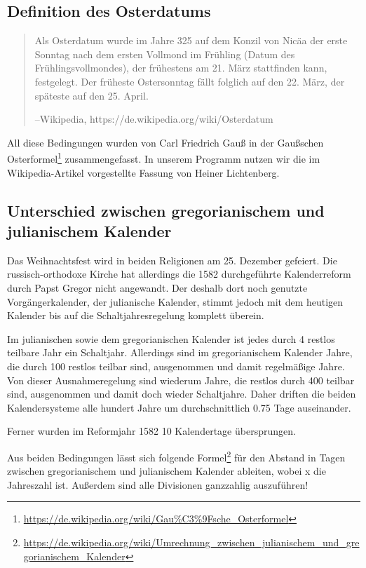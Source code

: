 \subsection{Definition des Osterdatums}
	\begin{quote}
		Als Osterdatum wurde im Jahre 325 auf dem Konzil von Nicäa der erste Sonntag nach dem ersten Vollmond im Frühling (Datum des Frühlingsvollmondes), der frühestens am 21. März stattfinden kann, festgelegt. Der früheste Ostersonntag fällt folglich auf den 22. März, der späteste auf den 25. April.

		\hfill{}--Wikipedia, https://de.wikipedia.org/wiki/Osterdatum
	\end{quote}

	All diese Bedingungen wurden von Carl Friedrich Gauß in der Gaußschen Osterformel\footnote{\url{https://de.wikipedia.org/wiki/Gau\%C3\%9Fsche_Osterformel}} zusammengefasst. In unserem Programm nutzen wir die im Wikipedia-Artikel vorgestellte Fassung von Heiner Lichtenberg.
\subsection{Unterschied zwischen gregorianischem und julianischem Kalender}
	Das Weihnachtsfest wird in beiden Religionen am 25. Dezember gefeiert. Die russisch-orthodoxe Kirche hat allerdings die 1582 durchgeführte Kalenderreform durch Papst Gregor nicht angewandt. Der deshalb dort noch genutzte Vorgängerkalender, der julianische Kalender, stimmt jedoch mit dem heutigen Kalender bis auf die Schaltjahresregelung komplett überein.

	Im julianischen sowie dem gregorianischen Kalender ist jedes durch 4 restlos teilbare Jahr ein Schaltjahr. Allerdings sind im gregorianischem Kalender Jahre, die durch 100 restlos teilbar sind, ausgenommen und damit regelmäßige Jahre. Von dieser Ausnahmeregelung sind wiederum Jahre, die restlos durch 400 teilbar sind, ausgenommen und damit doch wieder Schaltjahre. Daher driften die beiden Kalendersysteme alle hundert Jahre um durchschnittlich 0.75 Tage auseinander.

	Ferner wurden im Reformjahr 1582 10 Kalendertage übersprungen.

	Aus beiden Bedingungen lässt sich folgende Formel\footnote{\url{https://de.wikipedia.org/wiki/Umrechnung_zwischen_julianischem_und_gregorianischem_Kalender}} für den Abstand in Tagen zwischen gregorianischem und julianischem Kalender ableiten, wobei x die Jahreszahl ist. Außerdem sind  alle Divisionen ganzzahlig auszuführen! 

